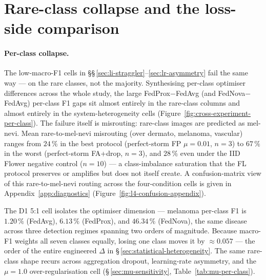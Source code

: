 \documentclass[11pt,a4paper]{report}
\begin{document}


\section{Rare-class collapse and the loss-side comparison}
\label{sec:rare-class-collapse}


\paragraph{Per-class collapse.}

The low-macro-F1 cells in \S\S\,\ref{sec:li-straggler}--\ref{sec:lr-asymmetry}
fail the same way --- on the rare classes, not the majority. Synthesising
per-class optimiser differences across the whole study, the large
FedProx$-$FedAvg (and FedNova$-$FedAvg) per-class F1 gaps sit almost entirely in
the rare-class columns and almost entirely in the system-heterogeneity cells
(Figure~\ref{fig:cross-experiment-per-class}). The failure itself is misrouting:
rare-class images are predicted as mel-nevi. Mean rare-to-mel-nevi
misrouting (over dermato, melanoma, vascular) ranges from $24\,\%$ in the
best protocol (perfect-storm FP $\mu = 0.01$, $n=3$) to $67\,\%$ in the
worst (perfect-storm FA+drop, $n=3$), and $28\,\%$ even under the IID
Flower negative control ($n=10$) --- a class-imbalance saturation that the
FL protocol preserves or amplifies but does not itself create. A confusion-matrix
view of this rare-to-mel-nevi routing across the four-condition cells is given in
Appendix~\ref{app:diagnostics} (Figure~\ref{fig:l4-confusion-appendix}).

The D1 5:1 cell isolates the optimiser dimension --- melanoma per-class F1 is
$1.20\,\%$ (FedAvg), $6.13\,\%$ (FedProx), and $46.34\,\%$ (FedNova), the same
disease across three detection regimes spanning two orders of magnitude. Because
macro-F1 weights all seven classes equally, losing one class moves it by
$\approx 0.057$ --- the order of the entire engineered $\Delta$ in
\S\,\ref{sec:statistical-heterogeneity}. The same rare-class shape recurs across
aggregation dropout, learning-rate asymmetry, and the $\mu = 1.0$
over-regularisation cell (\S\,\ref{sec:mu-sensitivity}, Table~\ref{tab:mu-per-class}).
\end{document}
